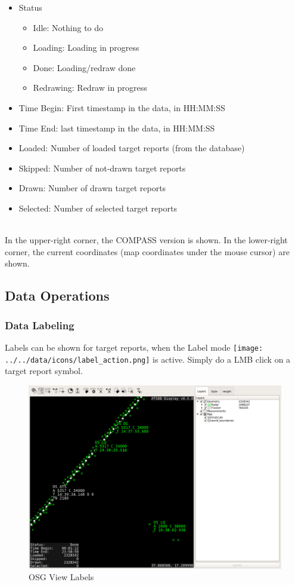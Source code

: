 \begin{itemize}
 \item Status
\begin{itemize}
 \item Idle: Nothing to do
 \item Loading: Loading in progress
 \item Done: Loading/redraw done
 \item Redrawing: Redraw in progress
\end{itemize}
 \item Time Begin: First timestamp in the data, in HH:MM:SS
 \item Time End: last timestamp in the data, in HH:MM:SS
 \item Loaded: Number of loaded target reports (from the database)
 \item Skipped: Number of not-drawn target reports
 \item Drawn: Number of drawn target reports
 \item Selected: Number of selected target reports
\end{itemize}
\  \\

In the upper-right corner, the COMPASS version is shown. In the lower-right corner, the current coordinates (map coordinates under the mouse cursor) are shown. 

\subsection{Data Operations}

\subsubsection{Data Labeling}

Labels can be shown for target reports, when the Label mode \texttt{[image: ../../data/icons/label\_action.png]} is active. Simply do a LMB click on a target report symbol.

\begin{figure}[H]
    \hspace*{-2.5cm}
    \includegraphics[width=19cm,frame]{figures/osgview_labels.png}
  \caption{OSG View Labels}
\end{figure}

